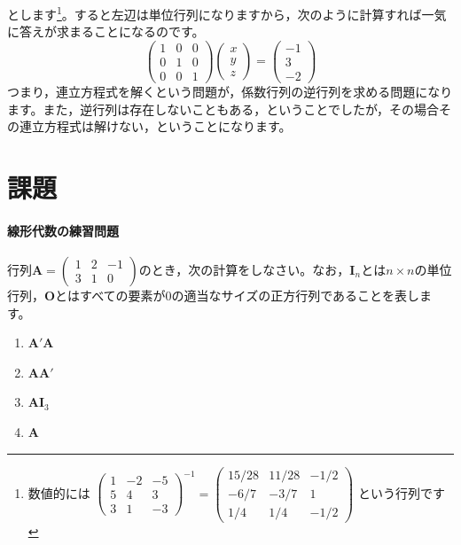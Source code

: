 \documentclass{ltjsbook}
\begin{document}
とします\footnote{数値的には
$\begin{pmatrix} 1 & -2 & -5 \\
                5 & 4  & 3  \\
                3 & 1  & -3\end{pmatrix}^{-1}
    =
    \begin{pmatrix} 15/28 & 11/28 & -1/2 \\
                -6/7  & -3/7  & 1    \\
                1/4   & 1/4   & -1/2\end{pmatrix}
$
という行列です}。すると左辺は単位行列になりますから，次のように計算すれば一気に答えが求まることになるのです。
\[
    \begin{pmatrix} 1 & 0 & 0 \\
                0 & 1 & 0 \\
                0 & 0 & 1\end{pmatrix}
    \begin{pmatrix} x \\ y \\ z \end{pmatrix}
    =
    \begin{pmatrix} -1 \\ 3 \\ -2 \end{pmatrix}
\]
つまり，連立方程式を解くという問題が，係数行列の逆行列を求める問題になります。また，逆行列は存在しないこともある，ということでしたが，その場合その連立方程式は解けない，ということになります。


\section{課題}
\paragraph{線形代数の練習問題}行列$\bm{A}=\begin{pmatrix}1 & 2 & -1\\3 & 1 & 0\end{pmatrix}$のとき，次の計算をしなさい。なお，$\bm{I}_n$とは$n \times n$の単位行列，$\bm{O}$とはすべての要素が0の適当なサイズの正方行列であることを表します。
\begin{enumerate}
    \item $\bm{A}'\bm{A}$
    \item $\bm{AA}'$
    \item $\bm{A}\bm{I}_3$
    \item $\bm{A}$
\end{enumerate}
\end{document}
